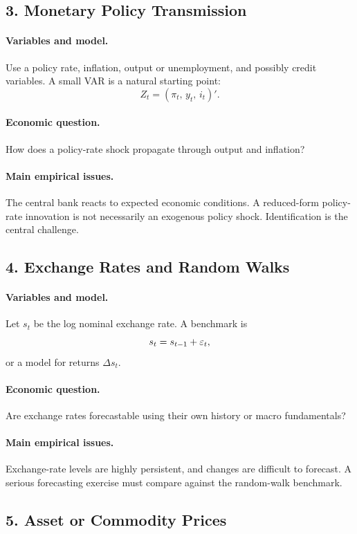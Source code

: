 \subsection{3. Monetary Policy Transmission}
\paragraph{Variables and model.}
Use a policy rate, inflation, output or unemployment, and possibly credit variables. A small VAR is a natural starting point:
\[
Z_t=(\pi_t,\,y_t,\,i_t)'.
\]

\paragraph{Economic question.}
How does a policy-rate shock propagate through output and inflation?

\paragraph{Main empirical issues.}
The central bank reacts to expected economic conditions. A reduced-form policy-rate innovation is not necessarily an exogenous policy shock. Identification is the central challenge.

\subsection{4. Exchange Rates and Random Walks}
\paragraph{Variables and model.}
Let $s_t$ be the log nominal exchange rate. A benchmark is
\[
s_t=s_{t-1}+\varepsilon_t,
\]
or a model for returns $\Delta s_t$.

\paragraph{Economic question.}
Are exchange rates forecastable using their own history or macro fundamentals?

\paragraph{Main empirical issues.}
Exchange-rate levels are highly persistent, and changes are difficult to forecast. A serious forecasting exercise must compare against the random-walk benchmark.

\subsection{5. Asset or Commodity Prices}
